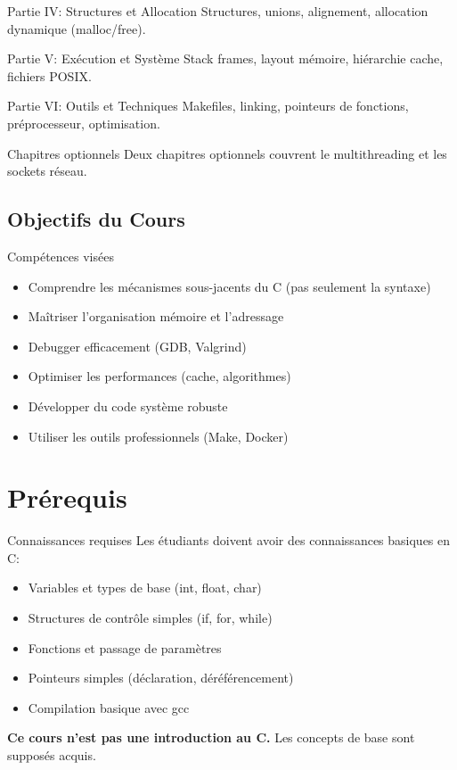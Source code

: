 \documentclass[11pt,a4paper]{article}
\begin{document}
\begin{definitionbox}{Partie IV: Structures et Allocation}
Structures, unions, alignement, allocation dynamique (malloc/free).
\end{definitionbox}

\begin{definitionbox}{Partie V: Exécution et Système}
Stack frames, layout mémoire, hiérarchie cache, fichiers POSIX.
\end{definitionbox}

\begin{definitionbox}{Partie VI: Outils et Techniques}
Makefiles, linking, pointeurs de fonctions, préprocesseur, optimisation.
\end{definitionbox}

\begin{warningbox}{Chapitres optionnels}
Deux chapitres optionnels couvrent le multithreading et les sockets réseau.
\end{warningbox}

\subsection{Objectifs du Cours}

\begin{techbox}{Compétences visées}
\begin{itemize}
\item Comprendre les mécanismes sous-jacents du C (pas seulement la syntaxe)
\item Maîtriser l'organisation mémoire et l'adressage
\item Debugger efficacement (GDB, Valgrind)
\item Optimiser les performances (cache, algorithmes)
\item Développer du code système robuste
\item Utiliser les outils professionnels (Make, Docker)
\end{itemize}
\end{techbox}

\section{Prérequis}

\begin{warningbox}{Connaissances requises}
Les étudiants doivent avoir des connaissances basiques en C:
\begin{itemize}
\item Variables et types de base (int, float, char)
\item Structures de contrôle simples (if, for, while)
\item Fonctions et passage de paramètres
\item Pointeurs simples (déclaration, déréférencement)
\item Compilation basique avec gcc
\end{itemize}

\textbf{Ce cours n'est pas une introduction au C.} Les concepts de base sont supposés acquis.
\end{warningbox}
\end{document}
